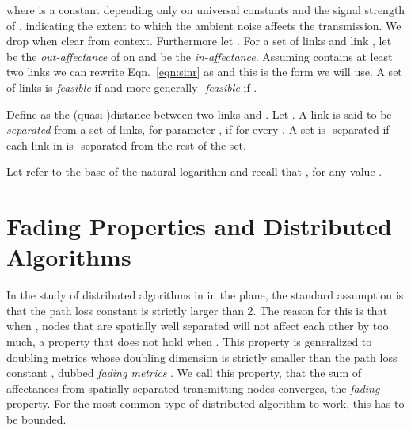 \documentclass[11pt]{amsart}
\begin{document}
where  is a constant depending only on universal constants and the signal strength  of , indicating the extent to which the ambient noise affects the transmission. 
We drop  when clear from context.
Furthermore let . For a set  of links and link , let  be the \emph{out-affectance} of  on  and  be the \emph{in-affectance}.
Assuming  contains at least two links we can rewrite Eqn.~\ref{eqn:sinr} as  and this is the form we will use.
A set  of links is \emph{feasible} if  
and more generally \emph{-feasible} if .






Define  as the (quasi-)distance between two links  and .
Let .
A link  is said to be \emph{-separated} from a set  of links, for
parameter , if  for every .  A set  is -separated if each link in  is
-separated from the rest of the set.

Let  refer to the base of the natural logarithm and recall that , for any value .



\section{Fading Properties and Distributed Algorithms}
\label{sec:fading}

\iffalse
\begin{quote}
\textbf{Summary of section:} Necessity of fading for the proper working of
distributed algorithms (potential interference-only signals from
far-away are one key difference in SS-models wrt.\ graphs).
We identify a new parameter, , the \emph{fading parameter} of
a decay space, and show that it is in particular bounded in 
a natural extension of doubling metrics.
We discuss to what extent that assumption is necessary.

Also: Want to claim that if algorithms hold in the plane, without
using geometry directly, but only the fading property, they work also
in decay spaces of bounded fading.
\end{quote}
\fi

In the study of distributed algorithms in  in the plane, the
standard assumption is that the path loss constant  is
strictly larger than 2. The reason for this is that when , nodes
that are spatially well separated will not affect each other by too
much, a property that does not hold when .
This property is generalized to doubling metrics whose doubling dimension is strictly smaller than the path loss constant , dubbed \emph{fading metrics} \cite{us:talg12}.
We call this property, that the sum of affectances from spatially separated transmitting nodes 
converges, the \emph{fading} property. For the most common type of distributed algorithm to work, this has to be bounded.
\end{document}
